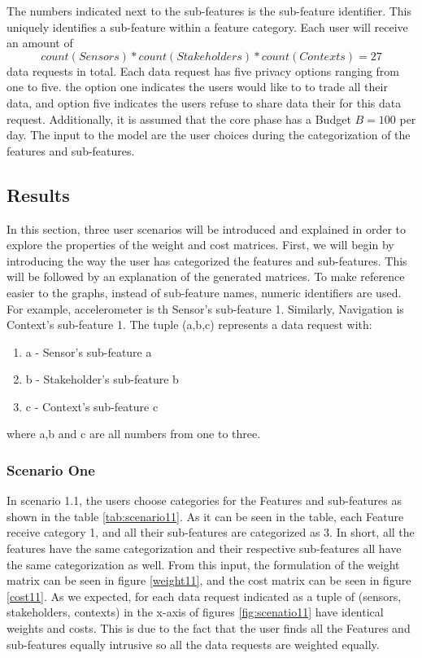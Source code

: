 The numbers indicated next to the sub-features is the sub-feature identifier. This uniquely identifies a sub-feature within a feature category.
Each user will receive an amount of $$count(Sensors)*count(Stakeholders)*count(Contexts)=27$$ data requests in total. Each data request has five privacy options ranging from one to five. the option one indicates the users would like to to trade all their data, and option five indicates the users refuse to share data their for this data request. Additionally, it is assumed that the core phase has a Budget $B=100$ per day. 
The input to the model are the user choices during the categorization of the features and sub-features.

\subsection{Results}

In this section, three user scenarios will be introduced and explained in order to explore the properties of the weight and cost matrices.
First, we will begin by introducing the way the user has categorized the features and sub-features. This will be followed by an explanation
of the generated matrices. To make reference easier to the graphs, instead of sub-feature names, numeric identifiers are used. For example, accelerometer is th Sensor's sub-feature 1. Similarly, Navigation is Context's sub-feature 1. The tuple (a,b,c) represents a data request with:
\begin{enumerate}
    \item a - Sensor's sub-feature a
    \item b - Stakeholder's sub-feature b
    \item c - Context's sub-feature c
   \end{enumerate}
where a,b and c are all numbers from one to three.

\subsubsection{Scenario One}

In scenario 1.1, the users choose categories for the Features and sub-features as shown in the table \ref{tab:scenario11}. As it can be seen in the table, each Feature receive
category 1, and all their sub-features are categorized as 3. In short, all the features have the same categorization and their respective
sub-features all have the same categorization as well. From this input, the formulation of the weight matrix can be seen in figure \ref{weight11}, and the cost matrix can be seen in figure \ref{cost11}.
As we expected, for each data request indicated as a tuple of (sensors, stakeholders, contexts) in the x-axis of figures \ref{fig:scenatio11} have identical weights and costs. This is due to the fact that the user finds all the Features and sub-features equally intrusive so all the data requests are weighted equally.

